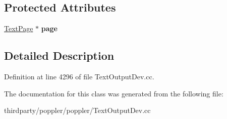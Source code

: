 \subsection*{Protected Attributes}
\begin{DoxyCompactItemize}
\item 
\mbox{\label{class_text_selection_visitor_a250b2cda6165ffb6e592fec482deb57a}} 
\hyperlink{class_text_page}{Text\+Page} $\ast$ {\bfseries page}
\end{DoxyCompactItemize}


\subsection{Detailed Description}


Definition at line 4296 of file Text\+Output\+Dev.\+cc.



The documentation for this class was generated from the following file\+:\begin{DoxyCompactItemize}
\item 
thirdparty/poppler/poppler/Text\+Output\+Dev.\+cc\end{DoxyCompactItemize}
